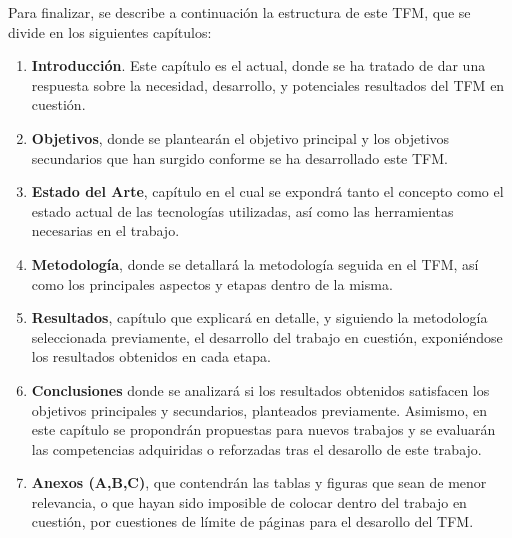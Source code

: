Para finalizar, se describe a continuación la estructura de este \ac{TFM}, que se divide en los siguientes capítulos:

\begin{enumerate}
    \item \textbf{Introducción}. Este capítulo es el actual, donde se ha tratado de dar una respuesta sobre la necesidad, desarrollo, y potenciales resultados del \ac{TFM} en cuestión.
    \item \textbf{Objetivos}, donde se plantearán el objetivo principal y los objetivos secundarios que han surgido conforme se ha desarrollado este \ac{TFM}. 
    \item \textbf{Estado del Arte}, capítulo en el cual se expondrá tanto el concepto como el estado actual de las tecnologías utilizadas, así como las herramientas necesarias en el trabajo.
    \item \textbf{Metodología}, donde se detallará la metodología seguida en el \ac{TFM}, así como los principales aspectos y etapas dentro de la misma.
    \item \textbf{Resultados}, capítulo que explicará en detalle, y siguiendo la metodología seleccionada previamente, el desarrollo del trabajo en cuestión, exponiéndose los resultados obtenidos en cada etapa. 
    \item \textbf{Conclusiones} donde se analizará si los resultados obtenidos satisfacen los objetivos principales y secundarios, planteados previamente. Asimismo, en este capítulo se propondrán propuestas para nuevos trabajos y se evaluarán las competencias adquiridas o reforzadas tras el desarollo de este trabajo.
    \item \textbf{Anexos (A,B,C)}, que contendrán las tablas y figuras que sean de menor relevancia, o que hayan sido imposible de colocar dentro del trabajo en cuestión, por cuestiones de límite de páginas para el desarollo del \ac{TFM}.
    
\end{enumerate}
